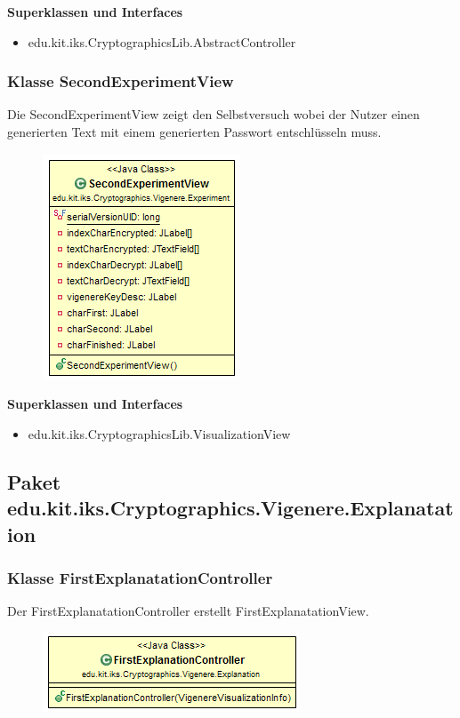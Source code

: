 \documentclass{article}
\begin{document}
      \textbf{Superklassen und Interfaces}
      \begin{itemize}
        \item edu.kit.iks.CryptographicsLib.AbstractController
      \end{itemize}

    \subsubsection{Klasse SecondExperimentView}
      Die SecondExperimentView zeigt den Selbstversuch wobei der Nutzer einen generierten Text mit einem generierten Passwort entschlüsseln muss.
      \begin{figure}[H]
        \centering
        \includegraphics{resources/edu-kit-iks-Cryptographics-Vigenere-SecondExperimentView}
      \end{figure}

      \textbf{Superklassen und Interfaces}
      \begin{itemize}
        \item edu.kit.iks.CryptographicsLib.VisualizationView
      \end{itemize}

  \subsection{Paket edu.kit.iks.Cryptographics.Vigenere.Explanatation}
    \subsubsection{Klasse FirstExplanatationController}
      Der FirstExplanatationController erstellt FirstExplanatationView.
      \begin{figure}[H]
        \centering
        \includegraphics{resources/edu-kit-iks-Cryptographics-Vigenere-FirstExplanationController}
      \end{figure}
\end{document}
